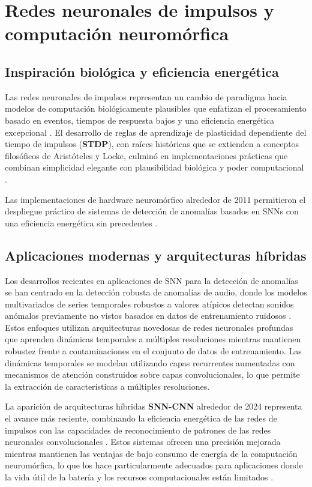 \section{Redes neuronales de impulsos y computación neuromórfica}
\subsection{Inspiración biológica y eficiencia energética}

Las redes neuronales de impulsos representan un cambio de paradigma hacia modelos de computación biológicamente plausibles que enfatizan el procesamiento basado en eventos, tiempos de respuesta bajos y una eficiencia energética excepcional \cite{maass_networks_1997}. El desarrollo de reglas de aprendizaje de plasticidad dependiente del tiempo de impulsos (\textbf{STDP}), con raíces históricas que se extienden a conceptos filosóficos de Aristóteles y Locke, culminó en implementaciones prácticas que combinan simplicidad elegante con plausibilidad biológica y poder computacional \cite{markram_history_2011}.

Las implementaciones de hardware neuromórfico alrededor de 2011 permitieron el despliegue práctico de sistemas de detección de anomalías basados en SNNs con una eficiencia energética sin precedentes \cite{indiveri_neuromorphic_2011}.

\subsection{Aplicaciones modernas y arquitecturas híbridas}

Los desarrollos recientes en aplicaciones de SNN para la detección de anomalías se han centrado en la detección robusta de anomalías de audio, donde los modelos multivariados de series temporales robustos a valores atípicos detectan sonidos anómalos previamente no vistos basados en datos de entrenamiento ruidosos \cite{lee_robust_2022}. Estos enfoques utilizan arquitecturas novedosas de redes neuronales profundas que aprenden dinámicas temporales a múltiples resoluciones mientras mantienen robustez frente a contaminaciones en el conjunto de datos de entrenamiento. Las dinámicas temporales se modelan utilizando capas recurrentes aumentadas con mecanismos de atención construidos sobre capas convolucionales, lo que permite la extracción de características a múltiples resoluciones.

La aparición de arquitecturas híbridas \textbf{SNN-CNN} alrededor de 2024 representa el avance más reciente, combinando la eficiencia energética de las redes de impulsos con las capacidades de reconocimiento de patrones de las redes neuronales convolucionales \cite{sanaullah_hybrid_2024}. Estos sistemas ofrecen una precisión mejorada mientras mantienen las ventajas de bajo consumo de energía de la computación neuromórfica, lo que los hace particularmente adecuados para aplicaciones donde la vida útil de la batería y los recursos computacionales están limitados \cite{liu_sparsity-aware_2024}.